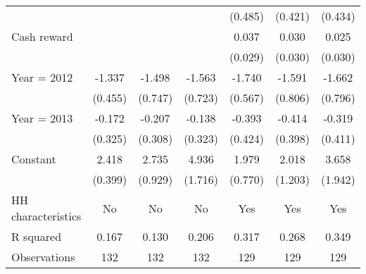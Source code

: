 \begin{tabular}{l*{6}{c}}
                    &            &            &            &     (0.485)&     (0.421)&     (0.434)\\
Cash reward         &            &            &            &       0.037&       0.030&       0.025\\
                    &            &            &            &     (0.029)&     (0.030)&     (0.030)\\
Year = 2012         &      -1.337&      -1.498&      -1.563&      -1.740&      -1.591&      -1.662\\
                    &     (0.455)&     (0.747)&     (0.723)&     (0.567)&     (0.806)&     (0.796)\\
Year = 2013         &      -0.172&      -0.207&      -0.138&      -0.393&      -0.414&      -0.319\\
                    &     (0.325)&     (0.308)&     (0.323)&     (0.424)&     (0.398)&     (0.411)\\
Constant            &       2.418&       2.735&       4.936&       1.979&       2.018&       3.658\\
                    &     (0.399)&     (0.929)&     (1.716)&     (0.770)&     (1.203)&     (1.942)\\
\hline
HH characteristics  &          No&          No&          No&         Yes&         Yes&         Yes\\
R squared           &       0.167&       0.130&       0.206&       0.317&       0.268&       0.349\\
Observations        &         132&         132&         132&         129&         129&         129\\
\hline\hline
\end{tabular}
